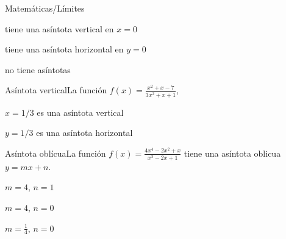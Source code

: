 \documentclass[12pt]{article}
\begin{document}
\begin{quiz}{Matemáticas/Límites}
\begin{multi}
			  \item*  tiene una asíntota vertical en $x=0$ 
			  \item tiene una asíntota horizontal en $y=0$ 
			  \item no tiene asíntotas
		  \end{multi}
		  
		  \begin{multi}[shuffle=true,numbering=none,
		  		  		  		   	   	feedback={Como $\lim_{x \to \infty} f(x) =1/3$, la recta $y=1/3$ es una asíntota horizontal.
		  		  		  		   	   	}]{Asíntota vertical}La función $f(x)=\frac{x^2+x-7}{3x^2+x+1}$,
			  \item $x=1/3$ es una asíntota vertical 
			  \item* $y=1/3$ es una asíntota horizontal
		  \end{multi}
		  
		  \begin{multi}[shuffle=true,numbering=none,
		  		  		  		  		   	   	feedback={}]{Asíntota oblícua}La función $f(x)=\frac{4x^4-2x^2+x}{x^3-2x+1}$ tiene una asíntota oblicua $y=mx+n$. 
			  	\item $m=4$, $n=1$ 
			  	\item* $m=4$, $n=0$ 
			  	\item $m=\frac{1}{4}$, $n=0$	  		  		  		   	   			  
		  \end{multi}
 \end{quiz}
\end{document}
